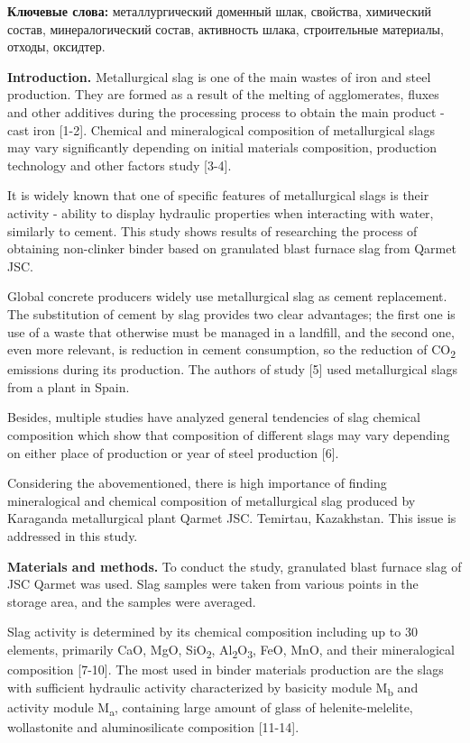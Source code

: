 \textbf{Ключевые слова:} металлургический доменный шлак, свойства,
химический состав, минералогический состав, активность шлака,
строительные материалы, отходы, оксидтер.

\textbf{Introduction.} Metallurgical slag is one of the main wastes of
iron and steel production. They are formed as a result of the melting of
agglomerates, fluxes and other additives during the processing process
to obtain the main product - cast iron {[}1-2{]}. Chemical and
mineralogical composition of metallurgical slags may vary significantly
depending on initial materials\textquotesingle{} composition, production
technology and other factors study {[}3-4{]}.

It is widely known that one of specific features of metallurgical slags
is their activity - ability to display hydraulic properties when
interacting with water, similarly to cement. This study shows results of
researching the process of obtaining non-clinker binder based on
granulated blast furnace slag from Qarmet JSC.

Global concrete producers widely use metallurgical slag as cement
replacement. The substitution of cement by slag provides two clear
advantages; the first one is use of a waste that otherwise must be
managed in a landfill, and the second one, even more relevant, is
reduction in cement consumption, so the reduction of CO\textsubscript{2}
emissions during its production. The authors of study {[}5{]} used
metallurgical slags from a plant in Spain.

Besides, multiple studies have analyzed general tendencies of slag
chemical composition which show that composition of different slags may
vary depending on either place of production or year of steel production
{[}6{]}.

Considering the abovementioned, there is high importance of finding
mineralogical and chemical composition of metallurgical slag produced by
Karaganda metallurgical plant Qarmet JSC. Temirtau, Kazakhstan. This
issue is addressed in this study.

\textbf{Materials and methods.} To conduct the study, granulated blast
furnace slag of JSC Qarmet was used. Slag samples were taken from
various points in the storage area, and the samples were averaged.

Slag activity is determined by its chemical composition including up to
30 elements, primarily CaO, MgO, SiO\textsubscript{2},
Al\textsubscript{2}O\textsubscript{3}, FeO, MnO, and their mineralogical
composition {[}7-10{]}. The most used in binder materials production are
the slags with sufficient hydraulic activity characterized by basicity
module M\textsubscript{b} and activity module M\textsubscript{a},
containing large amount of glass of helenite-melelite, wollastonite and
aluminosilicate composition {[}11-14{]}.

